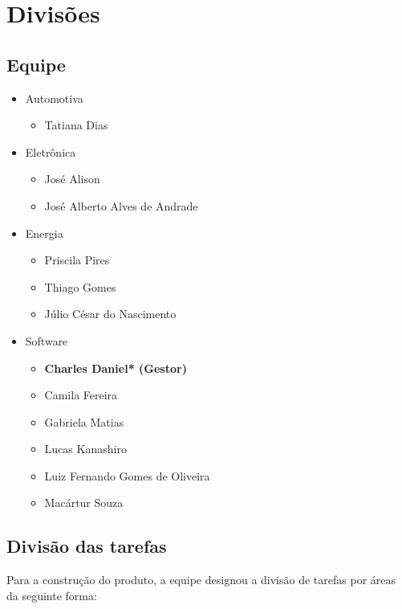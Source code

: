\chapter[Divisões]{Divisões}

\section{Equipe}
\begin{itemize}
	\item Automotiva
		\begin{itemize}
			\item Tatiana Dias
		\end{itemize}
	\item Eletrônica
		\begin{itemize}
			\item José Alison
			\item José Alberto Alves de Andrade
		\end{itemize}
	\item Energia
		\begin{itemize}
			\item Priscila Pires
			\item Thiago Gomes
			\item Júlio César do Nascimento
		\end{itemize}
	\item Software
		\begin{itemize}
			\item \textbf{Charles Daniel* (Gestor)}
			\item Camila Fereira
			\item Gabriela Matias
			\item Lucas Kanashiro
			\item Luiz Fernando Gomes de Oliveira
			\item Macártur Souza
		\end{itemize}
\end{itemize}

\section{Divisão das tarefas}
Para a construção do produto, a equipe designou a divisão de tarefas por áreas da seguinte forma:

